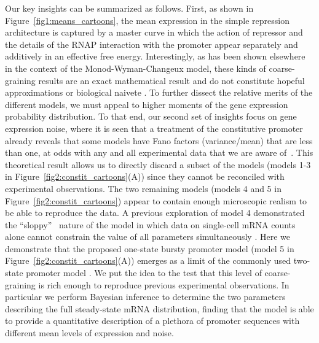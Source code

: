 Our key insights can be summarized as follows. First, as shown in
Figure~\ref{fig1:means_cartoons}, the mean expression in the simple repression
architecture is captured by a master curve in which the action of repressor and
the details of the RNAP interaction with the promoter appear separately and
additively in an effective free energy. Interestingly, as has been shown
elsewhere in the context of the Monod-Wyman-Changeux model, these kinds of
coarse-graining results are an exact mathematical result and do not constitute
hopeful approximations or biological naivete \cite{Razo-Mejia2018, Chure2019}.
To further dissect the relative merits of the different models, we must appeal
to higher moments of the gene expression probability distribution. To that end,
our second set of insights focus on gene expression noise, where it is seen that
a treatment of the constitutive promoter already reveals that some models have
Fano factors (variance/mean) that are less than one, at odds with any and all
experimental data that we are aware of~\cite{So2011, Jones2014}. This theoretical
result allows us to directly discard a subset of the models (models 1-3 in
Figure~\ref{fig2:constit_cartoons}(A)) since they cannot be reconciled with
experimental observations. The two remaining models (models 4 and 5 in
Figure~\ref{fig2:constit_cartoons}) appear to contain enough microscopic realism
to be able to reproduce the data. A previous exploration of model 4 demonstrated
the ``sloppy''~\cite{Transtrum2015} nature of the model
in which data on single-cell mRNA counts alone
cannot constrain the value of all parameters simultaneously
\cite{Razo-Mejia2020}. Here we demonstrate that the proposed one-state bursty
promoter model (model 5 in Figure~\ref{fig2:constit_cartoons}(A)) emerges as a
limit of the commonly used two-state promoter model \cite{Peccoud1995,
Shahrezaei2008, So2011, Sanchez2013, Jones2014}. We put the idea to the test
that this level of coarse-graining is rich enough to reproduce previous
experimental observations. In particular we perform Bayesian inference to
determine the two parameters describing the full steady-state mRNA distribution,
finding that the model is able to provide a quantitative description of a
plethora of promoter sequences with different mean levels of expression and
noise.

